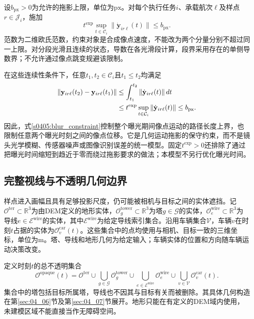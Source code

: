 设$b_{\mathrm{px}}>0$为允许的拖影上限，单位为$\mathrm{px}$。对每个执行任务$i$、承载航次$\ell$及样点$r\in\mathcal J_i$，施加
\begin{equation}
 t^{\mathrm{exp}}
 \sup_{t\in\mathcal C_i}\|\dot{\mathbf y}_{ir\ell}(t)\|
 \le b_{\mathrm{px}}.
 \label{s0405:blur_constraint}
\end{equation}
范数为二维欧氏范数，约束对象是合成像点速度，不能改为两个分量分别不超过同一上限。对分段光滑且连续的状态，导数在各光滑段计算，段界采用存在的单侧导数界；不允许通过像点跳变规避该限制。

在这些连续性条件下，任意$t_1,t_2\in\mathcal C_i$且$t_1\le t_2$均满足
\begin{align}
 \|\mathbf y_{ir\ell}(t_2)-\mathbf y_{ir\ell}(t_1)\|
 &\le\int_{t_1}^{t_2}\|\dot{\mathbf y}_{ir\ell}(t)\|\,dt\notag\\
 &\le t^{\mathrm{exp}}
       \sup_{t\in\mathcal C_i}\|\dot{\mathbf y}_{ir\ell}(t)\|
 \le b_{\mathrm{px}}.
 \label{s0405:blur_displacement_bound}
\end{align}
因此，式\eqref{s0405:blur_constraint}控制整个曝光期间像点运动的路径长度上界，也限制任意两个曝光时刻之间的像点位移。它是几何运动拖影的保守约束，而不是镜头光学模糊、传感器噪声或图像识别误差的统一模型。固定$t^{\mathrm{exp}}>0$还排除了通过把曝光时间缩短到趋近于零而绕过拖影要求的做法；本模型不另行优化曝光时间。

\subsection{完整视线与不透明几何边界}

样点进入画幅且具有足够投影尺度，仍可能被相机与目标之间的实体遮挡。记$\mathcal O^{\mathrm{ter}}\subset\mathbb R^3$为由DEM定义的地形实体，$\mathcal O_g^{\mathrm{tower}}\subset\mathbb R^3$为塔$g\in\mathcal G$的实体，$\mathcal O_e^{\mathrm{wire}}\subset\mathbb R^3$为导线$e\in\mathcal E^{\mathrm{wire}}$的实体，其中$\mathcal E^{\mathrm{wire}}$为给定导线索引集合。沿用车辆集合$\mathcal V$，车辆$v$在时刻$t$占据的实体为$\mathcal O_v^{\mathrm{car}}(t)$。这些集合中的点均使用与相机、目标一致的三维坐标，单位为$\mathrm m$。塔、导线和地形几何为给定输入；车辆实体的位置和方向随车辆运动决策改变。

定义时刻$t$的总不透明集合
\begin{equation}
 \mathcal O^{\mathrm{opaque}}(t)
 =\mathcal O^{\mathrm{ter}}
 \cup\bigcup_{g\in\mathcal G}\mathcal O_g^{\mathrm{tower}}
 \cup\bigcup_{e\in\mathcal E^{\mathrm{wire}}}\mathcal O_e^{\mathrm{wire}}
 \cup\bigcup_{v\in\mathcal V}\mathcal O_v^{\mathrm{car}}(t).
 \label{s0405:opaque_union}
\end{equation}
集合中的塔包括目标所属塔，导线也不因其与目标有关而被删除。其具体几何构造在第\ref{sec:04_06}节及第\ref{sec:04_07}节展开。地形只能在有定义的DEM域内使用，未建模区域不能直接当作无障碍空间。

